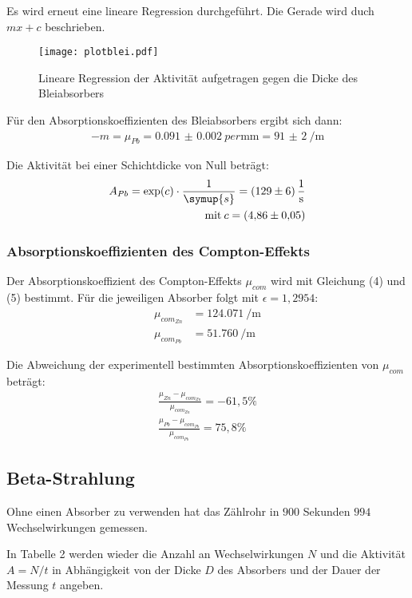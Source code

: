 Es wird erneut eine lineare Regression durchgeführt. Die Gerade wird duch $mx + c$ beschrieben.

\begin{figure}[H]
  \centering
  \texttt{[image: plotblei.pdf]}
  \caption{Lineare Regression der Aktivität aufgetragen gegen die Dicke des Bleiabsorbers}
  \label{fig:plot}
\end{figure}


Für den Absorptionskoeffizienten des Bleiabsorbers ergibt sich dann:
\begin{align*}
  -m = \mu_{Pb} = \SI{0.091(2)}{per\milli\meter} = \SI{91(2)}{\per\meter}
\end{align*}

Die Aktivität bei einer Schichtdicke von Null beträgt:
\begin{align*}
  A_{Pb} = \exp(c) \cdot \frac{1}{\symup{s}} = \SI{129(6)}{\per\second} \\
  \text{mit} \: c = \SI{4.86(5)}{}
\end{align*}

\subsubsection{Absorptionskoeffizienten des Compton-Effekts}

Der Absorptionskoeffizient des Compton-Effekts $\mu_{com}$ wird mit Gleichung (4) und (5) bestimmt. Für die jeweiligen Absorber
folgt mit $\epsilon = 1,2954$:
\begin{align*}
\mu_{com_{Zn}} &= \SI{124.071}{\per\meter}  \\
\mu_{com_{Pb}} &= \SI{51,760}{\per\meter}
\end{align*}

Die Abweichung der experimentell bestimmten Absorptionskoeffizienten von $\mu_{com}$ beträgt:
\begin{align*}
  \frac{\mu_{Zn}- \mu_{com_{Zn}}}{\mu_{com_{Zn}}} = -61,5 \% \\
  \frac{\mu_{Pb}- \mu_{com_{Pb}}}{\mu_{com_{Pb}}} = 75,8 \%
\end{align*}


\subsection{Beta-Strahlung}

Ohne einen Absorber zu verwenden hat das Zählrohr in $900$ Sekunden $994$ Wechselwirkungen gemessen.

In Tabelle 2 werden wieder die Anzahl an Wechselwirkungen $N$ und die Aktivität $A = N/t$ in Abhängigkeit von der Dicke $D$ des Absorbers und der
Dauer der Messung $t$ angeben.

